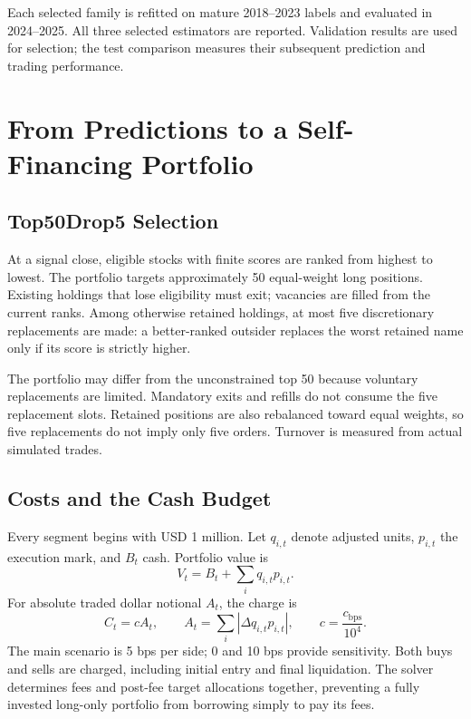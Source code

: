 \documentclass[11pt,a4paper]{article}
\begin{document}
Each selected family is refitted on mature 2018--2023 labels and evaluated
in 2024--2025. All three selected estimators are reported. Validation results
are used for selection; the test comparison measures their subsequent
prediction and trading performance.

\section{From Predictions to a Self-Financing Portfolio}
\label{sec:trading}
\subsection{Top50Drop5 Selection}
At a signal close, eligible stocks with finite scores are ranked from highest
to lowest. The portfolio targets approximately 50 equal-weight long positions.
Existing holdings that lose eligibility must exit; vacancies are filled from
the current ranks. Among otherwise retained holdings, at most five
discretionary replacements are made: a better-ranked outsider replaces the
worst retained name only if its score is strictly higher.

The portfolio may differ from the unconstrained top 50 because voluntary
replacements are limited. Mandatory exits and refills do not consume the
five replacement slots. Retained positions are also rebalanced toward equal
weights, so five replacements do not imply only five orders. Turnover is
measured from actual simulated trades.

\subsection{Costs and the Cash Budget}
Every segment begins with USD 1 million. Let $q_{i,t}$ denote adjusted units,
$p_{i,t}$ the execution mark, and $B_t$ cash. Portfolio value is
\begin{equation}
V_t=B_t+\sum_i q_{i,t}p_{i,t}.
\end{equation}
For absolute traded dollar notional $A_t$, the charge is
\begin{equation}
C_t=c A_t,\qquad
A_t=\sum_i|\Delta q_{i,t}p_{i,t}|,\qquad
c=\frac{c_{\mathrm{bps}}}{10^4}.
\label{eq:fees}
\end{equation}
The main scenario is 5 bps per side; 0 and 10 bps provide sensitivity.
Both buys and sells are charged, including initial entry and final liquidation.
The solver determines fees and post-fee target allocations together, preventing
a fully invested long-only portfolio from borrowing simply to pay its fees.
\end{document}
